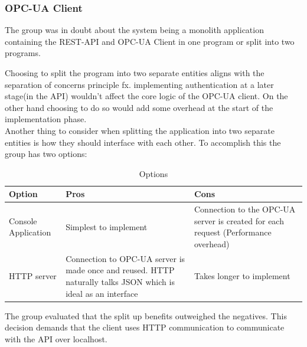 \subsubsection{OPC-UA Client}
The group was in doubt about the system being a monolith application containing 
the REST-API and OPC-UA Client in one program or split into two programs.

Choosing to split the program into two separate entities aligns with the 
separation of concerns principle fx. implementing authentication at a later 
stage(in the API) wouldn't affect the core logic of the OPC-UA client. On the 
other hand choosing to do so would add some overhead at the start of the 
implementation phase. \\

Another thing to consider when splitting the application into two separate 
entities is how they should interface with each other. To accomplish this the 
group has two options: 

\begin{table}[ht]
    \begin{tabularx}{\textwidth}{|>{\RaggedRight}X|>{\RaggedRight}X|>{\RaggedRight}X|}
        \hline
        \textbf{Option} & \textbf{Pros} & \textbf{Cons} \\
        \hline
        Console Application & Simplest to implement & Connection to the OPC-UA 
        server is created for each request (Performance overhead)\\
        \hline
        HTTP server & Connection to OPC-UA server is made once and reused. HTTP
        naturally talks JSON which is ideal as an interface & Takes longer to 
        implement \\
        \hline
    \end{tabularx}
    \caption{Options}
    \label{someLabel}
\end{table}

The group evaluated that the split up benefits outweighed the negatives. This 
decision demands that the client uses HTTP communication to communicate with the
API over localhost. 

